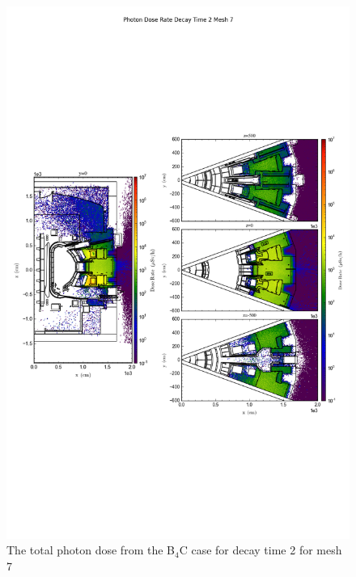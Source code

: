 \documentclass[12pt]{article}
\begin{document}
\begin{figure}[ht!]
\centering
\includegraphics[trim={0cm 9cm 0cm 10cm},clip,scale=0.75]{../plots/final_model/Photon_Dose_Rate_Decay_Time_2_Mesh_7.png}
\caption{The total photon dose from the B$_4$C case for decay time 2 for mesh 7}
\label{fig:ct_photons_dc2_no4bc_m7_flux}
\end{figure}

\newpage
\clearpage
\end{document}
